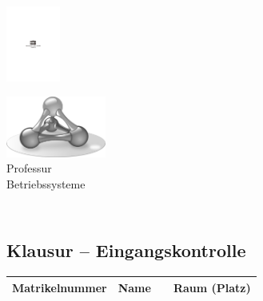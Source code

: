 \documentclass[12pt]{article}
\begin{document}
  \begin{minipage}[c]{4cm}
  \includegraphics[height=2.5cm,width=\textwidth,keepaspectratio]{TUC}
  \end{minipage}%
  \hfill%
  \begin{minipage}[c]{4cm}
  \includegraphics[height=2cm,width=\textwidth,keepaspectratio]{logo-sw} \\
  {\scriptsize{Professur\\[-2.5mm] Betriebssysteme}\vspace{1mm}}
  \end{minipage}


\begin{centering}
\section*{\coursename \xspace \coursesemester \\ Klausur -- Eingangskontrolle}
\end{centering}


\begin{tabularx}{\textwidth}{lllr}
\toprule
 Matrikelnummer & Name & & Raum (Platz)\\
\midrule

\bottomrule
\end{tabularx}
\end{document}
